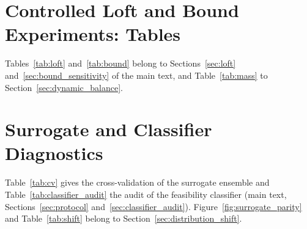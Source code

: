 \section{Controlled Loft and Bound Experiments: Tables}
\label{sec:supp_loft_tables}
Tables~\ref{tab:loft} and~\ref{tab:bound} belong to Sections~\ref{sec:loft} and~\ref{sec:bound_sensitivity} of the main text, and Table~\ref{tab:mass} to Section~\ref{sec:dynamic_balance}.

\begin{table}[htbp]
\centering\small
\caption{Controlled searches testing the chord clamp and the sensitivity to the bounds (ten seeds each, 287 evaluations, no pool).}
\label{tab:loft}
\resizebox{\linewidth}{!}{%
%
}
\end{table}

\begin{table}[htbp]
\centering\small
\caption{Share of the twenty best valid designs of the original database that lie within $3\%$ of the variable's range of its lower or upper bound.}
\label{tab:bound}

\end{table}

\begin{table}[htbp]
\centering\small
\caption{Mass balance sensitivity across airframe structural mass scaling factors ($0.7\times$ to $1.3\times$).}
\label{tab:mass}
\resizebox{\linewidth}{!}{%
%
}
\end{table}


\section{Surrogate and Classifier Diagnostics}
\label{sec:supp_surrogate}
Table~\ref{tab:cv} gives the cross-validation of the surrogate ensemble and Table~\ref{tab:classifier_audit} the audit of the feasibility classifier (main text, Sections~\ref{sec:protocol} and~\ref{sec:classifier_audit}). Figure~\ref{fig:surrogate_parity} and Table~\ref{tab:shift} belong to Section~\ref{sec:distribution_shift}.

\begin{table}[htbp]
\centering\small
\caption{Five-fold cross-validation of the surrogate ensemble on the feasible designs of the database.}
\label{tab:cv}

\end{table}

\begin{table}[htbp]
\centering\small
\caption{Held-out performance of the Random Forest feasibility classifier across five repeated stratified 80/20 random splits on the $\NclfNrows$-evaluation database ($p \ge 0.5$).}
\label{tab:classifier_audit}
\resizebox{\linewidth}{!}{}
\end{table}

